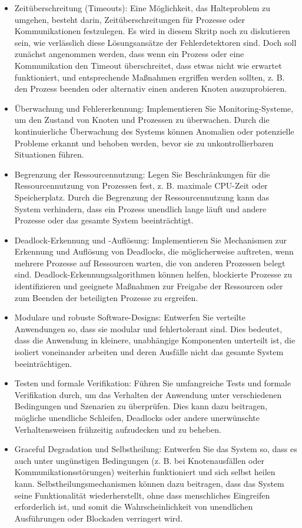 \documentclass[../vs-script-first-v01.tex]{subfiles}
\begin{document}
\begin{itemize}
\item Zeitüberschreitung (Timeouts): Eine Möglichkeit, das Halteproblem zu umgehen, besteht darin, Zeitüberschreitungen für Prozesse oder Kommunikationen festzulegen. Es wird in diesem Skritp noch zu diskutieren sein, wie verlässlich diese Lösungsansätze der Fehlerdetektoren sind. Doch soll zunächst angenommen werden, dass wenn ein Prozess oder eine Kommunikation den Timeout überschreitet, dass etwas nicht wie erwartet funktioniert, und entsprechende Maßnahmen ergriffen werden sollten, z. B. den Prozess beenden oder alternativ einen anderen Knoten auszuprobieren.
\item Überwachung und Fehlererkennung: Implementieren Sie Monitoring-Systeme, um den Zustand von Knoten und Prozessen zu überwachen. Durch die kontinuierliche Überwachung des Systems können Anomalien oder potenzielle Probleme erkannt und behoben werden, bevor sie zu unkontrollierbaren Situationen führen.
\item Begrenzung der Ressourcennutzung: Legen Sie Beschränkungen für die Ressourcennutzung von Prozessen fest, z. B. maximale CPU-Zeit oder Speicherplatz. Durch die Begrenzung der Ressourcennutzung kann das System verhindern, dass ein Prozess unendlich lange läuft und andere Prozesse oder das gesamte System beeinträchtigt.
\item Deadlock-Erkennung und -Auflösung: Implementieren Sie Mechanismen zur Erkennung und Auflösung von Deadlocks, die möglicherweise auftreten, wenn mehrere Prozesse auf Ressourcen warten, die von anderen Prozessen belegt sind. Deadlock-Erkennungsalgorithmen können helfen, blockierte Prozesse zu identifizieren und geeignete Maßnahmen zur Freigabe der Ressourcen oder zum Beenden der beteiligten Prozesse zu ergreifen.
\item Modulare und robuste Software-Designs: Entwerfen Sie verteilte Anwendungen so, dass sie modular und fehlertolerant sind. Dies bedeutet, dass die Anwendung in kleinere, unabhängige Komponenten unterteilt ist, die isoliert voneinander arbeiten und deren Ausfälle nicht das gesamte System beeinträchtigen.
\item Testen und formale Verifikation: Führen Sie umfangreiche Tests und formale Verifikation durch, um das Verhalten der Anwendung unter verschiedenen Bedingungen und Szenarien zu überprüfen. Dies kann dazu beitragen, mögliche unendliche Schleifen, Deadlocks oder andere unerwünschte Verhaltensweisen frühzeitig aufzudecken und zu beheben.
\item Graceful Degradation und Selbstheilung: Entwerfen Sie das System so, dass es auch unter ungünstigen Bedingungen (z. B. bei Knotenausfällen oder Kommunikationsstörungen) weiterhin funktioniert und sich selbst heilen kann. Selbstheilungsmechanismen können dazu beitragen, dass das System seine Funktionalität wiederherstellt, ohne dass menschliches Eingreifen erforderlich ist, und somit die Wahrscheinlichkeit von unendlichen Ausführungen oder Blockaden verringert wird.
\end{itemize}
\end{document}
